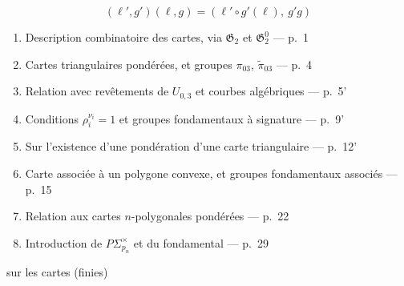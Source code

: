 \documentclass[11pt,a4paper]{article}
\begin{document}

\[
  (\ell', g')(\ell, g) = (\ell' \circ g'(\ell),\ g'g)
\]

\begin{enumerate}
  \item Description combinatoire des cartes, via $\mathfrak{G}_{2}$ et $\mathfrak{G}_{2}^{0}$ --- p.~1
  \item Cartes triangulaires pondérées, et groupes $\pi_{03}$, $\tilde\pi_{03}$ --- p.~4
  \item Relation avec revêtements de $U_{0,3}$ et courbes algébriques --- p.~5'
  \item Conditions $\rho_{i}^{\nu_{i}} = 1$ et groupes fondamentaux à signature --- p.~9'
  \item Sur l'existence d'une pondération d'une carte triangulaire --- p.~12'
  \item Carte associée à un polygone convexe, et groupes fondamentaux associés --- p.~15
  \item Relation aux cartes $n$-polygonales pondérées --- p.~22
  \item Introduction de $P\Sigma_{p_{n}}^{\times}$ et du  fondamental --- p.~29
\end{enumerate}

 sur les cartes (finies)
\end{document}

